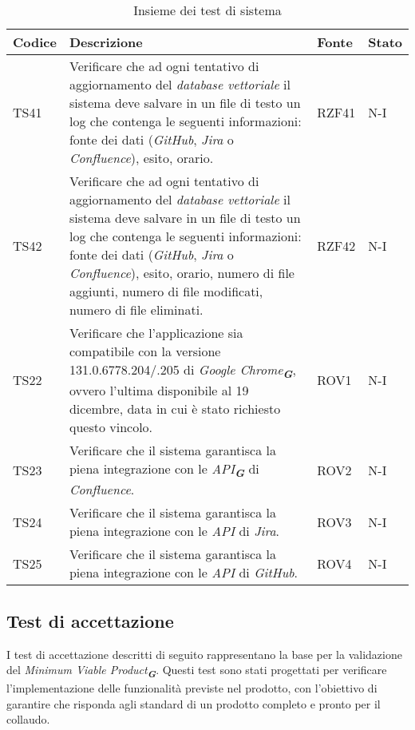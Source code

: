 \begin{table}[h!]
\begin{tabularx}{\textwidth}{|p{}|X|p{}|p{}|}
    \end{tabularx}
\end{table}

\newpage

\begin{table}[h!]
    \centering
    \renewcommand{\arraystretch}{1.5}
    \begin{tabularx}{\textwidth}{|p{}|X|p{}|p{}|}\hline
    \rowcolor[HTML]{FFD700}
    \textbf{Codice} & \textbf{Descrizione} & \textbf{Fonte} & \textbf{Stato} \\ \hline
 
    TS41 & Verificare che ad ogni tentativo di aggiornamento del \emph{database vettoriale} il sistema deve salvare in un file di testo un log che contenga le seguenti informazioni: fonte dei dati (\emph{GitHub}, \emph{Jira} o \emph{Confluence}), esito, orario. & RZF41 & N-I \\ \hline
    TS42 & Verificare che ad ogni tentativo di aggiornamento del \emph{database vettoriale} il sistema deve salvare in un file di testo un log che contenga le seguenti informazioni: fonte dei dati (\emph{GitHub}, \emph{Jira} o \emph{Confluence}), esito, orario, numero di file aggiunti, numero di file modificati, numero di file eliminati. & RZF42 & N-I \\ \hline
    TS22 & Verificare che l'applicazione sia compatibile con la versione  131.0.6778.204/.205 di \emph{Google Chrome}\textsubscript{\textit{\textbf{G}}}, ovvero l’ultima disponibile al 19 dicembre, data in cui è stato richiesto questo vincolo. & ROV1 & N-I \\ \hline
    TS23 & Verificare che il sistema garantisca la piena integrazione con le \emph{API}\textsubscript{\textit{\textbf{G}}} di \emph{Confluence}. & ROV2 & N-I \\ \hline
    TS24 & Verificare che il sistema garantisca la piena integrazione con le \emph{API} di \emph{Jira}. & ROV3 & N-I \\ \hline
    TS25 & Verificare che il sistema garantisca la piena integrazione con le \emph{API} di \emph{GitHub}. & ROV4 & N-I \\ \hline

    \end{tabularx}
    \caption{Insieme dei test di sistema}
\end{table}

\newpage

\subsection{Test di accettazione}
\label{sec:Test di accettazione}
I test di accettazione descritti di seguito rappresentano la base per la validazione del \emph{Minimum Viable Product}\textsubscript{\textit{\textbf{G}}}. Questi test sono stati progettati per verificare l’implementazione delle funzionalità previste nel prodotto, con l’obiettivo di garantire che risponda agli standard di un prodotto completo e pronto per il collaudo.

